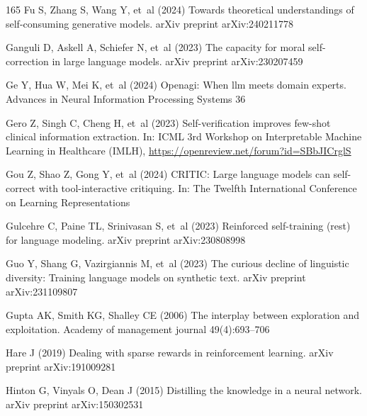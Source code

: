 \documentclass[sn-basic, Numbered]{sn-jnl}%
\theoremstyle{thmstyleone}%
\theoremstyle{thmstyletwo}%
\theoremstyle{thmstylethree}%
\begin{document}
\begin{thebibliography}{165}
Fu S, Zhang S, Wang Y, et~al (2024) Towards theoretical understandings of self-consuming generative models. arXiv preprint arXiv:240211778

Ganguli D, Askell A, Schiefer N, et~al (2023) The capacity for moral self-correction in large language models. arXiv preprint arXiv:230207459

Ge Y, Hua W, Mei K, et~al (2024) Openagi: When llm meets domain experts. Advances in Neural Information Processing Systems 36

Gero Z, Singh C, Cheng H, et~al (2023) Self-verification improves few-shot clinical information extraction. In: ICML 3rd Workshop on Interpretable Machine Learning in Healthcare (IMLH), \urlprefix\url{https://openreview.net/forum?id=SBbJICrglS}

Gou Z, Shao Z, Gong Y, et~al (2024) {CRITIC}: Large language models can self-correct with tool-interactive critiquing. In: The Twelfth International Conference on Learning Representations

Gulcehre C, Paine TL, Srinivasan S, et~al (2023) Reinforced self-training (rest) for language modeling. arXiv preprint arXiv:230808998

Guo Y, Shang G, Vazirgiannis M, et~al (2023) The curious decline of linguistic diversity: Training language models on synthetic text. arXiv preprint arXiv:231109807

Gupta AK, Smith KG, Shalley CE (2006) The interplay between exploration and exploitation. Academy of management journal 49(4):693--706

Hare J (2019) Dealing with sparse rewards in reinforcement learning. arXiv preprint arXiv:191009281

Hinton G, Vinyals O, Dean J (2015) Distilling the knowledge in a neural network. arXiv preprint arXiv:150302531


\end{thebibliography}
\end{document}
